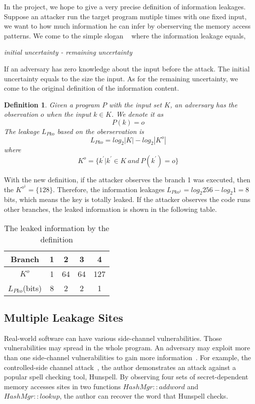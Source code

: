 In the project, we hope to give a very precise definition of information leakages. 
Suppose an attacker run the target program mutiple times with one fixed input, we
want to how much information he can infer by oberserving the memory access patterns.
We come to the simple slogan ~\cite{10.1007/978-3-642-00596-1_21} where the information
leakage equals,

\textit{initial uncertainty - remaining uncertainty}

If an adversary has zero knowledge about the input before the attack. The initial uncertainty
equals to the size the input. As for the remaining uncertainty, we come to the original definition
of the information content.

\newtheorem{mydef}{Definition}

\begin{mydef}
Given a program $P$ with the input set $K$, 
an adversary has the observation $o$ when the input $k{\in}K$. 
We denote it as
    $$P(k) = o$$
The leakage $L_{Pko}$ based on the oberservation is
    $$L_{Pko} = log_2{|K|} - log_2{|K^o|}$$
    where
    $$K^o = \{k^{'} | k^{'}{\in}K \ and \ P(k^{'}) = o \}$$
\end{mydef}

With the new definition, if the attacker observes the branch 1 was executed, then the
$K^{o^{1}} = \{128\}$. Therefore, the information leakages $L_{Pko^{1}} = log_2{256} - log_2{1} = 8$
bits, which means the key is totally leaked. If the attacker observes the code runs other
branches, the leaked information is shown in the following table.

\begin{table}[h]
    \centering
    \begin{tabular}{|c|c|c|c|c|}
    \hline
    Branch & 1 & 2  & 3  & 4   \\ \hline
    $K^o$   & 1 & 64 & 64 & 127 \\ \hline
    $L_{Pko}$(bits)   & 8 & 2  & 2  & 1   \\ \hline
    \end{tabular}
    \caption{The leaked information by the definition}
\end{table}

\subsection{Multiple Leakage Sites}
Real-world software can have various side-channel vulnerabilities. Those vulnerabilities 
may spread in the whole program. An adversary may exploit more than one side-channel vulnerabilities 
to gain more information~\cite{7163052, 191010}. For example, the controlled-side channel attack~\cite{7163052}, the author 
demonstrates an attack against a popular spell checking tool, Hunspell. By observing four sets 
of secret-dependent memory accesses sites in two functions $HashMgr::addword$ and $HashMgr::lookup$, 
the author can recover the word that Hunspell checks.

